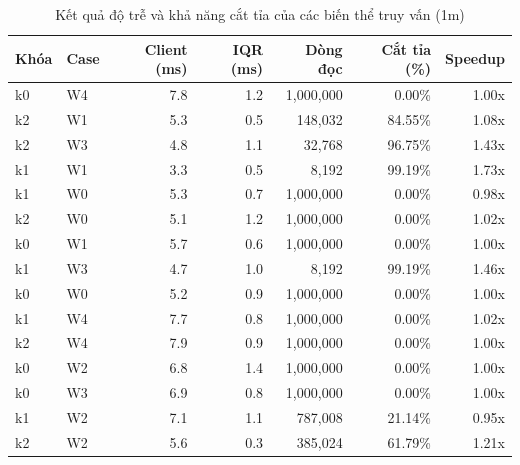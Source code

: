 \begin{table}[htbp]
\centering
\caption{Kết quả độ trễ và khả năng cắt tỉa của các biến thể truy vấn (1m)}
\label{tab:queries_1m}
\begin{tabular}{llrrrrr}
\toprule
\textbf{Khóa} & \textbf{Case} & \textbf{Client (ms)} & \textbf{IQR (ms)} & \textbf{Dòng đọc} & \textbf{Cắt tỉa (\%)} & \textbf{Speedup} \\
\midrule
    k0 & W4 & 7.8 & 1.2 & 1,000,000 & 0.00\% & 1.00x \\
    k2 & W1 & 5.3 & 0.5 & 148,032 & 84.55\% & 1.08x \\
    k2 & W3 & 4.8 & 1.1 & 32,768 & 96.75\% & 1.43x \\
    k1 & W1 & 3.3 & 0.5 & 8,192 & 99.19\% & 1.73x \\
    k1 & W0 & 5.3 & 0.7 & 1,000,000 & 0.00\% & 0.98x \\
    k2 & W0 & 5.1 & 1.2 & 1,000,000 & 0.00\% & 1.02x \\
    k0 & W1 & 5.7 & 0.6 & 1,000,000 & 0.00\% & 1.00x \\
    k1 & W3 & 4.7 & 1.0 & 8,192 & 99.19\% & 1.46x \\
    k0 & W0 & 5.2 & 0.9 & 1,000,000 & 0.00\% & 1.00x \\
    k1 & W4 & 7.7 & 0.8 & 1,000,000 & 0.00\% & 1.02x \\
    k2 & W4 & 7.9 & 0.9 & 1,000,000 & 0.00\% & 1.00x \\
    k0 & W2 & 6.8 & 1.4 & 1,000,000 & 0.00\% & 1.00x \\
    k0 & W3 & 6.9 & 0.8 & 1,000,000 & 0.00\% & 1.00x \\
    k1 & W2 & 7.1 & 1.1 & 787,008 & 21.14\% & 0.95x \\
    k2 & W2 & 5.6 & 0.3 & 385,024 & 61.79\% & 1.21x \\
\bottomrule
\end{tabular}
\end{table}
